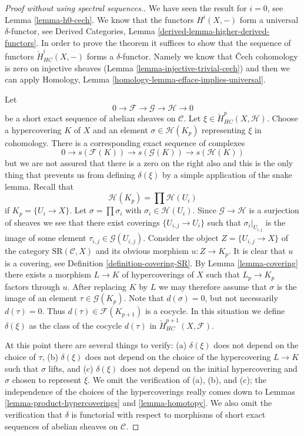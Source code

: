 \begin{proof}[Proof without using spectral sequences.]
We have seen the result for $i = 0$, see Lemma \ref{lemma-h0-cech}.
We know that the functors $H^i(X, -)$ form a universal $\delta$-functor, see
Derived Categories, Lemma \ref{derived-lemma-higher-derived-functors}.
In order to prove the theorem it suffices to show that
the sequence of functors $\check{H}^i_{HC}(X, -)$ forms a
$\delta$-functor. Namely we know that {\v C}ech cohomology
is zero on injective sheaves (Lemma \ref{lemma-injective-trivial-cech})
and then we can apply
Homology, Lemma \ref{homology-lemma-efface-implies-universal}.

\medskip\noindent
Let
$$
0 \to \mathcal{F} \to \mathcal{G} \to \mathcal{H} \to 0
$$
be a short exact sequence of abelian sheaves on $\mathcal{C}$.
Let $\xi \in \check{H}^p_{HC}(X, \mathcal{H})$. Choose a hypercovering
$K$ of $X$ and an element $\sigma \in \mathcal{H}(K_p)$ representing
$\xi$ in cohomology. There is a corresponding exact sequence of
complexes
$$
0 \to s(\mathcal{F}(K)) \to s(\mathcal{G}(K)) \to s(\mathcal{H}(K))
$$
but we are not assured that there is a zero on the right also and this
is the only thing that
prevents us from defining $\delta(\xi)$ by a simple application of the
snake lemma. Recall that
$$
\mathcal{H}(K_p) = \prod \mathcal{H}(U_i)
$$
if $K_p = \{U_i \to X\}$. Let $\sigma =\prod \sigma_i$ with
$\sigma_i \in \mathcal{H}(U_i)$. Since $\mathcal{G} \to \mathcal{H}$ is
a surjection of sheaves we see that there exist coverings
$\{U_{i, j} \to U_i\}$ such that $\sigma_i|_{U_{i, j}}$ is the
image of some element $\tau_{i, j} \in \mathcal{G}(U_{i, j})$.
Consider the object $Z = \{U_{i, j} \to X\}$ of the category
$\text{SR}(\mathcal{C}, X)$ and its obvious morphism
$u : Z \to K_p$. It is clear that $u$ is a covering, see
Definition \ref{definition-covering-SR}. By
Lemma \ref{lemma-covering} there
exists a morphism $L \to K$ of hypercoverings of $X$ such that
$L_p \to K_p$ factors through $u$. After replacing $K$ by $L$
we may therefore assume that $\sigma$ is the image of an
element $\tau \in \mathcal{G}(K_p)$. Note that $d(\sigma) = 0$,
but not necessarily $d(\tau) = 0$. Thus $d(\tau) \in \mathcal{F}(K_{p + 1})$
is a cocycle. In this situation we define
$\delta(\xi)$ as the class of the cocycle $d(\tau)$ in
$\check{H}^{p + 1}_{HC}(X, \mathcal{F})$.

\medskip\noindent
At this point there are several things to verify:
(a) $\delta(\xi)$ does not depend on the choice of $\tau$,
(b) $\delta(\xi)$ does not depend on the choice of the hypercovering
$L \to K$ such that $\sigma$ lifts, and
(c) $\delta(\xi)$ does not depend on the initial hypercovering and
$\sigma$ chosen to represent $\xi$. We omit the verification of
(a), (b), and (c); the independence of the choices of the hypercoverings
really comes down to Lemmas \ref{lemma-product-hypercoverings}
and \ref{lemma-homotopy}. We also omit the verification that
$\delta$ is functorial with respect to morphisms of short exact
sequences of abelian sheaves on $\mathcal{C}$.


\end{proof}

